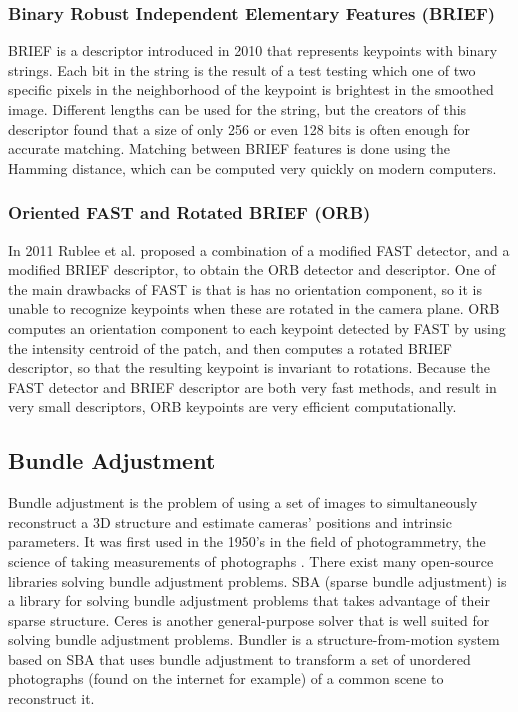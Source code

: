 \subsubsection{Binary Robust Independent Elementary Features (BRIEF)}
BRIEF \cite{brief} is a descriptor introduced in 2010 that represents keypoints with binary strings. Each bit in the string is the result of a test testing which one of two specific pixels in the neighborhood of the keypoint is brightest in the smoothed image. Different lengths can be used for the string, but the creators of this descriptor found that a size of only 256 or even 128 bits is often enough for accurate matching. Matching between BRIEF features is done using the Hamming distance, which can be computed very quickly on modern computers.

\subsubsection{Oriented FAST and Rotated BRIEF (ORB)}
In 2011 Rublee et al. \cite{orb} proposed a combination of a modified FAST detector, and a modified BRIEF descriptor, to obtain the ORB detector and descriptor. One of the main drawbacks of FAST is that is has no orientation component, so it is unable to recognize keypoints when these are rotated in the camera plane. ORB computes an orientation component to each keypoint detected by FAST by using the intensity centroid of the patch, and then computes a rotated BRIEF descriptor, so that the resulting keypoint is invariant to rotations. Because the FAST detector and BRIEF descriptor are both very fast methods, and result in very small descriptors, ORB keypoints are very efficient computationally.

\subsection{Bundle Adjustment}
Bundle adjustment is the problem of using a set of images to simultaneously reconstruct a 3D structure and estimate cameras' positions and intrinsic parameters. It was first used in the 1950's in the field of photogrammetry, the science of taking measurements of photographs \cite{bamodernsynthesis}. There exist many open-source libraries solving bundle adjustment problems. SBA (sparse bundle adjustment) \cite{sba} is a library for solving bundle adjustment problems that takes advantage of their sparse structure. Ceres \cite{ceres-solver} is another general-purpose solver that is well suited for solving bundle adjustment problems. Bundler \cite{bundler} is a structure-from-motion system based on SBA that uses bundle adjustment to transform a set of unordered photographs (found on the internet for example) of a common scene to reconstruct it.

